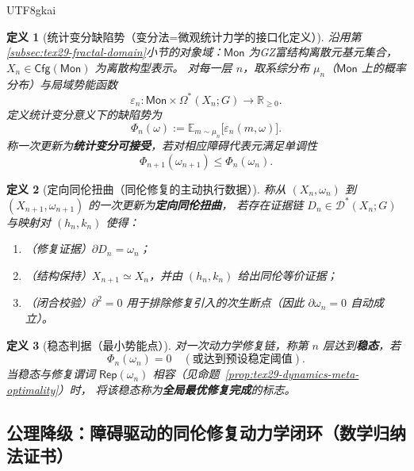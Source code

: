 \documentclass[12pt]{article}
\newtheorem{definition}{定义}[section]
\newcommand{\RR}{\mathbb{R}}
\newcommand{\GZMon}{\texorpdfstring{GZ富结构离散元}{GZ富结构离散元}}
\begin{document}
\begin{CJK*}{UTF8}{gkai}
\begin{definition}[统计变分缺陷势（变分法=微观统计力学的接口化定义）]
沿用第\ref{subsec:tex29-fractal-domain}小节的对象域：$\mathsf{Mon}$ 为\GZMon{}基元集合，$X_n\in\mathsf{Cfg}(\mathsf{Mon})$ 为离散构型表示。
对每一层 $n$，取系综分布 $\mu_n$（$\mathsf{Mon}$ 上的概率分布）与局域势能函数
\[
  \varepsilon_n:\mathsf{Mon}\times \Omega^*(X_n;G)\to \RR_{\ge 0}.
\]
定义统计变分意义下的缺陷势为
\[
  \Phi_n(\omega):=\mathbb{E}_{m\sim\mu_n}\bigl[\varepsilon_n(m,\omega)\bigr].
\]
称一次更新为\textbf{统计变分可接受}，若对相应障碍代表元满足单调性
\[
  \Phi_{n+1}(\omega_{n+1})\le \Phi_n(\omega_n).
\]
\end{definition}

\begin{definition}[定向同伦扭曲（同伦修复的主动执行数据）]
称从 $(X_n,\omega_n)$ 到 $(X_{n+1},\omega_{n+1})$ 的一次更新为\textbf{定向同伦扭曲}，
若存在证据链 $D_n\in\mathcal{D}^{*}(X_n;G)$ 与映射对 $(h_n,k_n)$ 使得：
\begin{enumerate}
  \item （修复证据）$\partial D_n=\omega_n$；
  \item （结构保持）$X_{n+1}\simeq X_n$，并由 $(h_n,k_n)$ 给出同伦等价证据；
  \item （闭合校验）$\partial^2=0$ 用于排除修复引入的次生断点（因此 $\partial\omega_n=0$ 自动成立）。
\end{enumerate}
\end{definition}

\begin{definition}[稳态判据（最小势能点）]
对一次动力学修复链，称第 $n$ 层达到\textbf{稳态}，若
\[
  \Phi_n(\omega_n)=0\quad(\text{或达到预设稳定阈值}).
\]
当稳态与修复谓词 $\mathsf{Rep}(\omega_n)$ 相容（见命题~\ref{prop:tex29-dynamics-meta-optimality}）时，
将该稳态称为\textbf{全局最优修复完成}的标志。
\end{definition}

\subsection{公理降级：障碍驱动的同伦修复动力学闭环（数学归纳法证书）}
\label{subsec:tex29-dynamics-meta-loop}


\end{CJK*}
\end{document}
